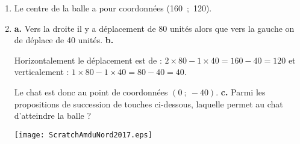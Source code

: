 
\medskip

%
%
%
%
%

\begin{enumerate}
\item %
Le centre de la balle a pour coordonnées (160~;~120).
\item %


\parbox{0.4\linewidth}{\textbf{a.} %
Vers la droite il y a déplacement de 80 unités alors que vers la gauche on de déplace de 40 unités.
\textbf{b.} %

Horizontalement le déplacement est de : $2 \times 80 - 1 \times 40 = 160 - 40 = 120$ et verticalement : $1 \times 80 - 1 \times 40 = 80 - 40 = 40$.

Le chat est donc au point de coordonnées $(0~;~- 40)$.
\textbf{c.} Parmi les propositions de succession de touches ci-dessous, laquelle permet au
chat d'atteindre la balle ?} \hfill 
\parbox{0.58\linewidth}{\texttt{[image: ScratchAmduNord2017.eps]}}


\end{enumerate}
